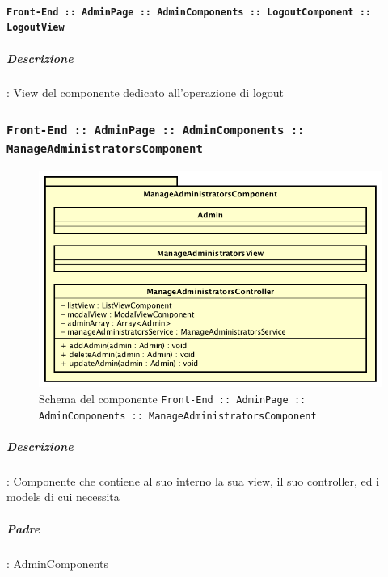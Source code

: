 \documentclass[../DefinizioneDiProdotto_v3.0.0.tex]{subfiles}
\begin{document}
			\paragraph{\texttt{Front-End :: AdminPage :: AdminComponents :: LogoutComponent :: LogoutView}}
				\subparagraph{Descrizione}: View del componente dedicato all'operazione di logout

	\newpage
	\subsubsection{\texttt{Front-End :: AdminPage :: AdminComponents :: ManageAdministratorsComponent}}
	\begin{figure}[!h]
		\centering
		\includegraphics[scale=0.7]{Architettura/Front-End/AdminPage/AdminComponents/ManageAdministratorsComponent.png}
		\caption{Schema del componente \texttt{Front-End :: AdminPage :: AdminComponents :: ManageAdministratorsComponent}}
	\end{figure}

			\subparagraph{Descrizione}: Componente che contiene al suo interno la sua view, il suo controller, ed i models di cui necessita
			\subparagraph{Padre}: AdminComponents
\end{document}
